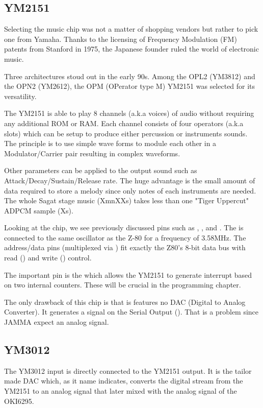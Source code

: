 \subsection{YM2151}
Selecting the music chip was not a matter of shopping vendors but rather to pick one from Yamaha. Thanks to the licensing of Frequency Modulation (FM) patents from Stanford in 1975, the Japanese founder ruled the world of electronic music.

Three architectures stoud out in the early 90s. Among the OPL2 (YM3812) and the OPN2 (YM2612), the OPM (OPerator type M) YM2151 was selected for its versatility. 

The YM2151 is able to play 8 channels (a.k.a voices) of audio without requiring any additional ROM or RAM. Each channel consists of four operators (a.k.a slots) which can be setup to produce either percussion or instruments sounds. The principle is to use simple wave forms to module each other in a Modulator/Carrier pair resulting in complex waveforms\cite{fmProgramming}.


Other parameters can be applied to the output sound such as Attack/Decay/Sustain/Release rate. The huge advantage is the small amount of data required to store a melody since only notes of each instruments are needed. The whole Sagat stage music (XmnXXs) takes less than one "Tiger Uppercut" ADPCM sample (Xs).

Looking at the chip, we see previously discussed pins such as , , and . The  is connected to the same oscillator as the Z-80 for a frequency of 3.58MHz. The  address/data pins (multiplexed via ) fit exactly the Z80's 8-bit data bus with read () and write () control.

The important pin is the  which allows the YM2151 to generate interrupt based on two internal counters. These will be crucial in the programming chapter.


The only drawback of this chip is that is features no DAC (Digital to Analog Converter). It generates a signal on the Serial Output (). That is a problem since JAMMA expect an analog signal.

\subsection{YM3012}
The YM3012 input is directly connected to the YM2151 output. It is the tailor made DAC which, as it name indicates, converts the digital stream from the YM2151 to an analog signal that later mixed with the analog signal of the OKI6295.

